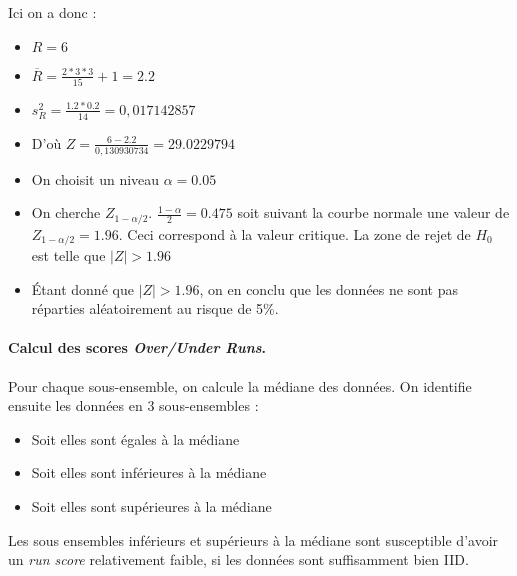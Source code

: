 Ici on a donc : 
\begin{itemize}
\item $R = 6$
\item $\overline{R}= \frac{2*3*3}{15}+1 = 2.2 $
\item $s_R^2 = \frac{1.2*0.2}{14} = 0,017142857$
\item D'où $ Z = \frac{6 -2.2}{0,130930734} = 29.0229794$
\item On choisit un niveau $\alpha=0.05$
\item On cherche $Z_{1-\alpha/2}$. $\frac{1-\alpha}{2}=0.475$ soit suivant la courbe normale une valeur de $Z_{1-\alpha/2}=1.96$. Ceci correspond à la valeur critique. La zone de rejet de $H_0$ est telle que $|Z| > 1.96$
\item Étant donné que $|Z| > 1.96$, on en conclu que les données ne sont pas réparties aléatoirement au risque de 5\%.\\

\end{itemize}


\paragraph{Calcul des scores \textit{Over/Under Runs}.\\}
Pour chaque sous-ensemble, on calcule la médiane des données. On identifie ensuite les données en 3 sous-ensembles :
\begin{itemize}
\item Soit elles sont égales à la médiane
\item Soit elles sont inférieures à la médiane
\item Soit elles sont supérieures à la médiane
\end{itemize}
Les sous ensembles inférieurs et supérieurs à la médiane sont susceptible d'avoir un \textit{run score} relativement faible, si les données sont suffisamment bien IID.\\

